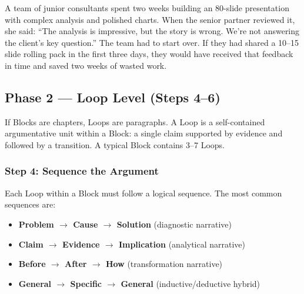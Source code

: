 \begin{alertbox}
A team of junior consultants spent two weeks building an 80-slide presentation with complex analysis and polished charts. When the senior partner reviewed it, she said: ``The analysis is impressive, but the story is wrong. We're not answering the client's key question.'' The team had to start over. If they had shared a 10--15 slide rolling pack in the first three days, they would have received that feedback in time and saved two weeks of wasted work.
\end{alertbox}

\subsection{Phase 2 --- Loop Level (Steps 4--6)}

If Blocks are chapters, Loops are paragraphs. A Loop is a self-contained argumentative unit within a Block: a single claim supported by evidence and followed by a transition. A typical Block contains 3--7 Loops.

\subsubsection{Step 4: Sequence the Argument}

Each Loop within a Block must follow a logical sequence. The most common sequences are:

\begin{itemize}
  \item \textbf{Problem $\rightarrow$ Cause $\rightarrow$ Solution} (diagnostic narrative)
  \item \textbf{Claim $\rightarrow$ Evidence $\rightarrow$ Implication} (analytical narrative)
  \item \textbf{Before $\rightarrow$ After $\rightarrow$ How} (transformation narrative)
  \item \textbf{General $\rightarrow$ Specific $\rightarrow$ General} (inductive/deductive hybrid)
\end{itemize}

